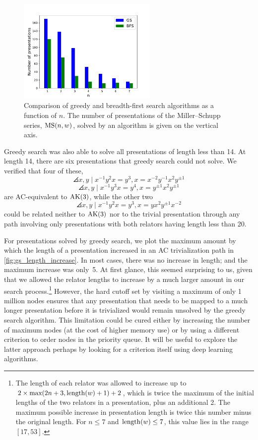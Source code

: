 \begin{figure}
	\centering
    \includegraphics[width=0.6\textwidth]{fig/performance_of_search_vs_n.pdf}
    \caption{Comparison of greedy and breadth-first search algorithms as a function of $n$.
    The number of presentations of the Miller--Schupp series, $\text{MS}(n, w)$, solved by an algorithm is given on the vertical axis.}
	\label{fig:performance_of_search_vs_n}
\end{figure}

Greedy search was also able to solve all presentations of length less than 14.
At length 14, there are six presentations that greedy search could not solve. We verified that four of these,
\[
\angles{x, y \mid x^{-1} y^2 x = y^{3} , x = x^{-2} y^{-1} x^2 y^{\pm 1}}
\]
\[
\angles{x, y \mid x^{-1} y^3 x = y^{4} , x = y^{\pm 1} x^2 y^{\pm 1}}
\]
are AC-equivalent to $\text{AK}(3)$, while the other two
\[
\angles{x, y \mid x^{-1} y^2 x = y^{3} , x = y x^2 y^{\pm 1} x^{-2}}
\]
could be related neither to $\text{AK}(3)$ nor to the trivial presentation through any path involving only presentations with both relators having length less than 20.

For presentations solved by greedy search, we plot the maximum amount by which the length of a presentation increased in an AC trivialization path in \autoref{fig:gs_length_increase}.
In most cases, there was no increase in length; and the maximum increase was only~5.
At first glance, this seemed surprising to us, given that we allowed the relator lengths to increase by a much larger amount in our search process.\footnote{The length of each relator was allowed to increase up to \(2 \times \text{max}(2n+3, \operatorname{length}(w)+1) + 2\), which is twice the maximum of the initial lengths of the two relators in a presentation, plus an additional 2.
The maximum possible increase in presentation length is twice this number minus the original length.
For $n \leq 7$ and $\operatorname{length}(w) \leq 7$, this value lies in the range $[17, 53]$.}
However, the hard cutoff set by visiting a maximum of only 1 million nodes ensures that any presentation that needs to be mapped to a much longer presentation before it is trivialized would remain unsolved by the greedy search algorithm.
This limitation could be cured either by increasing the number of maximum nodes (at the cost of higher memory use) or by using a different criterion to order nodes in the priority queue.
It will be useful to explore the latter approach perhaps by looking for a criterion itself using deep learning algorithms.


